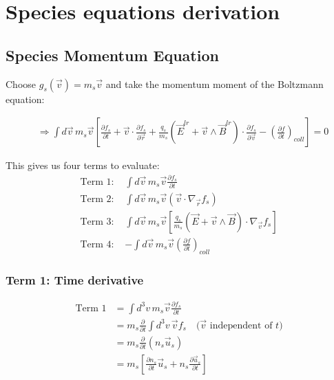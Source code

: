 \chapter{Species equations derivation}
\section{Species Momentum Equation}
\label{sec:Species Momentum Equation}

Choose $g_s(\vec{v}) = m_s \vec{v}$ and take the momentum moment of the Boltzmann equation:

\begin{align*}
&\Rightarrow \int d\vec{v} \, m_s \vec{v} \left[\frac{\partial f_s}{\partial t}+ \vec{v} \cdot \frac{\partial f_s}{\partial \vec{r}} + \frac{q_s}{m_s}(\vec{E}^{lr} + \vec{v} \wedge \vec{B}^{lr}) \cdot \frac{\partial f_s}{\partial \vec{v}} - \left(\frac{\partial f}{\partial t}\right)_{coll}\right] = 0
\end{align*}

This gives us four terms to evaluate:
\begin{align*}
\text{Term 1: } & \int d\vec{v} \, m_s \vec{v} \frac{\partial f_s}{\partial t} \\
\text{Term 2: } & \int d\vec{v} \, m_s \vec{v} (\vec{v} \cdot \nabla_{\vec{r}} f_s) \\
\text{Term 3: } & \int d\vec{v} \, m_s \vec{v} \left[\frac{q_s}{m_s}(\vec{E} + \vec{v} \wedge \vec{B}) \cdot \nabla_{\vec{v}} f_s\right] \\
\text{Term 4: } & -\int d\vec{v} \, m_s \vec{v} \left(\frac{\partial f}{\partial t}\right)_{coll}
\end{align*}

\subsection{Term 1: Time derivative}

\begin{align*}
\text{Term 1} &= \int d^3v \, m_s \vec{v} \frac{\partial f_s}{\partial t}  \\
&= m_s \frac{\partial}{\partial t} \int d^3v \, \vec{v} f_s \quad \text{($\vec{v}$ independent of $t$)}  \\
&= m_s \frac{\partial}{\partial t} (n_s \vec{u}_s)  \\
&= m_s \left[ \frac{\partial n_s}{\partial t} \vec{u}_s + n_s \frac{\partial \vec{u}_s}{\partial t} \right]
\end{align*}

